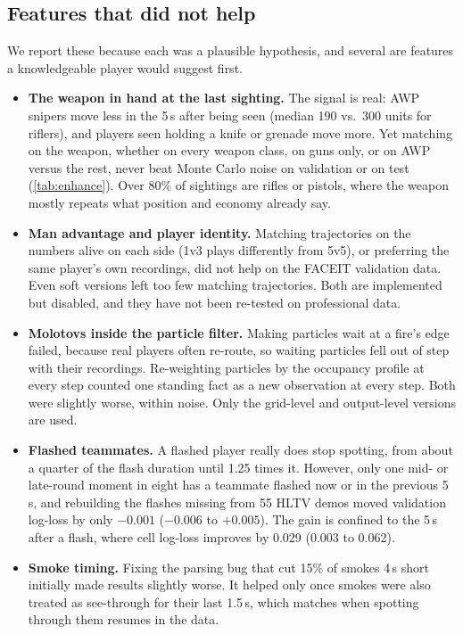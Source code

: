 \documentclass[11pt]{article}
\newcommand{\1}{\mathbb{1}}
\begin{document}
\subsection{Features that did not help}
\label{sec:negative}
We report these because each was a plausible hypothesis, and several are features a knowledgeable player would suggest first.
\begin{itemize}
  \item \textbf{The weapon in hand at the last sighting.} The signal is real: AWP snipers move less in the 5\,s after being seen (median 190 vs.\ 300 units for riflers), and players seen holding a knife or grenade move more. Yet matching on the weapon, whether on every weapon class, on guns only, or on AWP versus the rest, never beat Monte Carlo noise on validation or on test (\cref{tab:enhance}). Over 80\% of sightings are rifles or pistols, where the weapon mostly repeats what position and economy already say.
  \item \textbf{Man advantage and player identity.} Matching trajectories on the numbers alive on each side (1v3 plays differently from 5v5), or preferring the same player's own recordings, did not help on the FACEIT validation data. Even soft versions left too few matching trajectories. Both are implemented but disabled, and they have not been re-tested on professional data.
  \item \textbf{Molotovs inside the particle filter.} Making particles wait at a fire's edge failed, because real players often re-route, so waiting particles fell out of step with their recordings. Re-weighting particles by the occupancy profile at every step counted one standing fact as a new observation at every step. Both were slightly worse, within noise. Only the grid-level and output-level versions are used.
  \item \textbf{Flashed teammates.} A flashed player really does stop spotting, from about a quarter of the flash duration until 1.25 times it. However, only one mid- or late-round moment in eight has a teammate flashed now or in the previous 5\,s, and rebuilding the flashes missing from 55 HLTV demos moved validation log-loss by only $-0.001$ ($-0.006$ to $+0.005$). The gain is confined to the 5\,s after a flash, where cell log-loss improves by 0.029 (0.003 to 0.062).
  \item \textbf{Smoke timing.} Fixing the parsing bug that cut 15\% of smokes 4\,s short initially made results slightly worse. It helped only once smokes were also treated as see-through for their last 1.5\,s, which matches when spotting through them resumes in the data.
\end{itemize}
\end{document}
